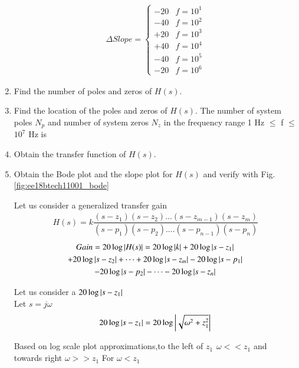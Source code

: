 \begin{enumerate}[label=\thesection.\arabic*.,ref=\thesection.\theenumi]
\begin{align}
 \Delta Slope = 
 \begin{cases} 
      -20 &  f = 10^{1} \\
      -40 &  f = 10^{2} \\
      +20 &  f = 10^{3} \\
      +40 &  f = 10^{4} \\
      -40 &  f = 10^{5} \\
      -20 &  f = 10^{6} 
 \end{cases}
\end{align}

\item Find the number of poles and zeros of $H(s)$.
\\
\solution 

\item Find the location of the poles and zeros of $H(s)$.
The number of system poles $N_{p}$ and number of system zeros $N_{z}$ in the frequency range 1 Hz $\leq$ f $\leq$ $10^{7}$ Hz is

\item Obtain the transfer function of $H(s)$.
\item Obtain the Bode plot and the slope plot for $H(s)$ and verify with  Fig. \ref{fig:ee18btech11001_bode}

\solution 
\textsf{Let us consider a generalized transfer gain}
\\
\begin{align}
H(s) = k \dfrac{(s-z_{1})(s-z_{2})...(s-z_{m-1})(s-z_{m})}{(s-p_{1})(s-p_{2})....(s-p_{n-1})(s-p_{n})}
\end{align}
\begin{multline}
Gain = 20\log\left\vert H(s)\right\vert = 20\log \left\vert k\right\vert + 20\log \left\vert s-z_{1}\right\vert 
    \\
    + 20\log \left\vert s-z_{2}\right\vert + \dots + 20\log \left\vert s-z_{m}\right\vert - 20\log \left\vert s-p_{1}\right\vert 
    \\
    - 20\log \left\vert s-p_{2}\right\vert - \dots - 20\log \left\vert s-z_{n}\right\vert 
\end{multline}



Let us consider a $ 20\log \left\vert s-z_{1}\right\vert $
\\
Let $s = j\omega$
\\

\begin{align}
	20\log \left\vert s-z_{1}\right\vert = 20\log \left\vert\sqrt{\omega^{2} + z_{1}^{2}}\right\vert 
\end{align}

Based on log scale plot approximations,to the 
left of $z_{1} \hspace{5pt} \omega << z_{1} $ and towards right  $ \omega >> z_{1} $
For $\omega < z_{1}$


\end{enumerate}

